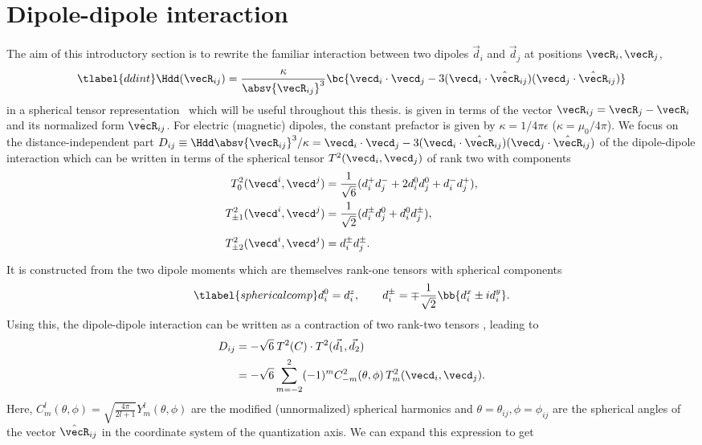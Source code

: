 \section{Dipole-dipole interaction}
The aim of this introductory section is to rewrite the familiar interaction between two dipoles $\vec{d}_i$ and $\vec{d}_j$ at positions $\vecR_i, \vecR_j$,
\begin{align} \tlabel{ddint}
\Hdd(\vecR_{ij}) = \frac{\kappa}{\absv{\vecR_{ij}}^3} \bc{ \vecd_i \cdot \vecd_j -3 (\vecd_i \cdot \hat{\vecR}_{ij})(\vecd_j \cdot \hat{\vecR}_{ij}) }
\end{align}
in a spherical tensor representation~\cite{Micheli2007,Gorshkov2011c} which will be useful throughout this thesis.
 is given in terms of the vector $\vecR_{ij} = \vecR_j - \vecR_i$ and its normalized form $\hat{\vecR}_{ij}$.
For electric (magnetic) dipoles, the constant prefactor is given by $\kappa = 1/4\pi\epsilon$ ($\kappa=\mu_0/4\pi$).
We focus on the distance-independent part $D_{ij} \equiv \Hdd \absv{\vecR_{ij}}^3/\kappa=\vecd_i \cdot \vecd_j -3 (\vecd_i \cdot \hat{\vecR}_{ij})(\vecd_j \cdot \hat{\vecR}_{ij})$ of the dipole-dipole interaction which can be written in terms of the spherical tensor $T^2(\vecd_i, \vecd_j)$ of rank two with components
\begin{align}
T^2_0(\vecd^i, \vecd^j) &= \frac{1}{\sqrt{6}} (d_i^+ d_j^- + 2d_i^0 d_j^0 + d_i^{-} d_j^{+}), \\
T^2_{\pm 1}(\vecd^i, \vecd^j) &= \frac{1}{\sqrt{2}} (d_i^{\pm} d_j^0 + d_i^0 d_j^{\pm}), \\
T^2_{\pm 2}(\vecd^i, \vecd^j) &= d_i^{\pm} d_j^{\pm} \vphantom{\frac{1}{42}}.
\end{align}
It is constructed from the two dipole moments which are themselves rank-one tensors with spherical components
\begin{align} \tlabel{sphericalcomp}
d^0_i = d^z_i, \qquad d_i^\pm = \mp\frac{1}{\sqrt{2}}\bb{d_i^x\pm i d_i^y}.
\end{align}
Using this, the dipole-dipole interaction can be written as a contraction of two rank-two tensors \cite{Brown2003}, leading to
\begin{align}
    D_{ij} &= -\sqrt{6} \: T^2(C)\cdot T^2(\vec{d_1},\vec{d_2})\\
           &= -\sqrt{6}  \sum_{m=-2}^{2} (-1)^m C^2_{-m}(\theta,\phi) \, T^2_m(\vecd_i,\vecd_j).
\end{align}
Here, $C^l_m(\theta,\phi)=\sqrt{\frac{4\pi}{2l+1}} Y^l_m(\theta,\phi)$ are the modified (unnormalized) spherical harmonics and $\theta = \theta_{ij}, \phi = \phi_{ij}$ are the spherical angles of the vector $\hat{\vecR}_{ij}$ in the coordinate system of the quantization axis. We can expand this expression to get

